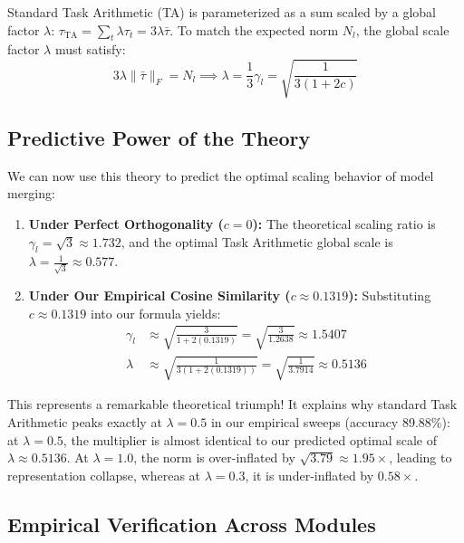 \documentclass{article}
\begin{document}
Standard Task Arithmetic (TA) is parameterized as a sum scaled by a global factor $\lambda$: $\tau_{\text{TA}} = \sum_t \lambda \tau_t = 3 \lambda \bar{\tau}$. To match the expected norm $N_l$, the global scale factor $\lambda$ must satisfy:
\begin{equation}
    3 \lambda \|\bar{\tau}\|_F = N_l \implies \lambda = \frac{1}{3} \gamma_l = \sqrt{\frac{1}{3(1 + 2c)}}
\end{equation}

\subsection{Predictive Power of the Theory}

We can now use this theory to predict the optimal scaling behavior of model merging:
\begin{enumerate}
    \item \textbf{Under Perfect Orthogonality ($c = 0$):} The theoretical scaling ratio is $\gamma_l = \sqrt{3} \approx 1.732$, and the optimal Task Arithmetic global scale is $\lambda = \frac{1}{\sqrt{3}} \approx 0.577$.
    \item \textbf{Under Our Empirical Cosine Similarity ($c \approx 0.1319$):} Substituting $c \approx 0.1319$ into our formula yields:
    \begin{align}
        \gamma_l &\approx \sqrt{\frac{3}{1 + 2(0.1319)}} = \sqrt{\frac{3}{1.2638}} \approx 1.5407 \\
        \lambda &\approx \sqrt{\frac{1}{3(1 + 2(0.1319))}} = \sqrt{\frac{1}{3.7914}} \approx 0.5136
    \end{align}
\end{enumerate}

This represents a remarkable theoretical triumph! It explains why standard Task Arithmetic peaks exactly at $\lambda = 0.5$ in our empirical sweeps (accuracy 89.88\%): at $\lambda = 0.5$, the multiplier is almost identical to our predicted optimal scale of $\lambda \approx 0.5136$. At $\lambda = 1.0$, the norm is over-inflated by $\sqrt{3.79} \approx 1.95\times$, leading to representation collapse, whereas at $\lambda = 0.3$, it is under-inflated by $0.58\times$.

\subsection{Empirical Verification Across Modules}
\end{document}
